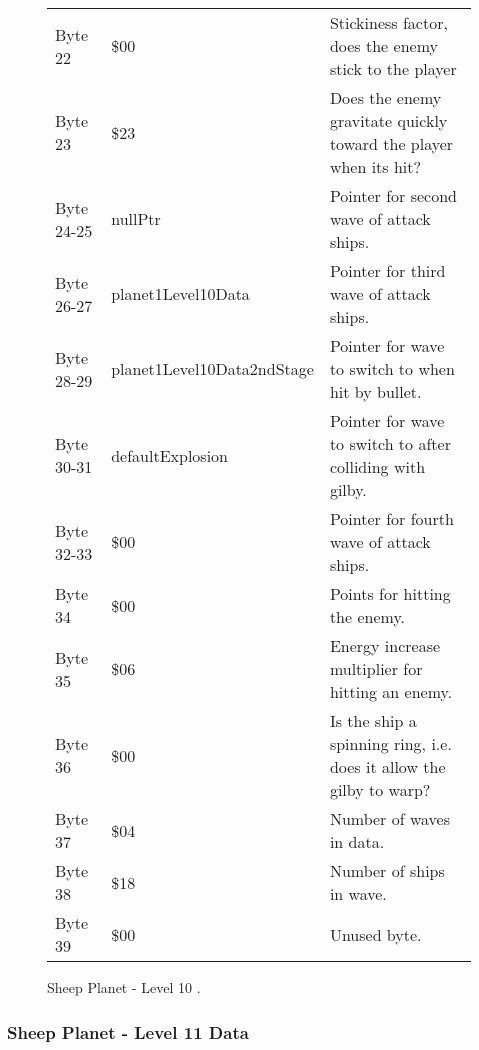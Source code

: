 \begin{figure}[H]
{\begin{adjustbox}{width=12cm}
\begin{tabular}{lll}
 Byte 22    & \$00                        & Stickiness factor, does the enemy stick to the player               \\
 Byte 23    & \$23                        & Does the enemy gravitate quickly toward the player when its hit?    \\
 Byte 24-25 & nullPtr                    & Pointer for second wave of attack ships.                            \\
 Byte 26-27 & planet1Level10Data         & Pointer for third wave of attack ships.                             \\
 Byte 28-29 & planet1Level10Data2ndStage & Pointer for wave to switch to when hit by bullet.                   \\
 Byte 30-31 & defaultExplosion           & Pointer for  wave to switch to after colliding with gilby.          \\
 Byte 32-33 & \$00                        & Pointer for fourth wave of attack ships.                            \\
 Byte 34    & \$00                        & Points for hitting the enemy.                                       \\
 Byte 35    & \$06                        & Energy increase multiplier for hitting an enemy.                    \\
 Byte 36    & \$00                        & Is the ship a spinning ring, i.e. does it allow the gilby to warp?  \\
 Byte 37    & \$04                        & Number of waves in data.                                            \\
 Byte 38    & \$18                        & Number of ships in wave.                                            \\
 Byte 39    & \$00                        & Unused byte.                                                        \\
\bottomrule
\end{tabular}

  \end{adjustbox}

  }\caption*{Sheep Planet - Level 10
.}
\end{figure}

\clearpage
\subsubsection{Sheep Planet - Level 11 Data}


